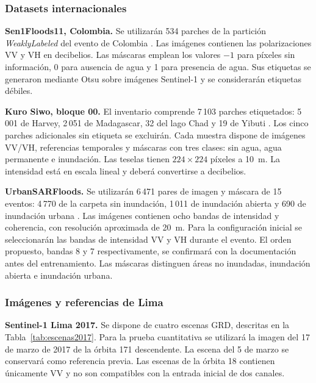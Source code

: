 \documentclass[conference]{IEEEtran}
\begin{document}
\subsubsection{Datasets internacionales}

\textbf{Sen1Floods11, Colombia.}
Se utilizarán 534 parches de la partición
\textit{WeaklyLabeled} del evento de Colombia
\cite{bonafilia2020sen1floods11}.
Las imágenes contienen las polarizaciones VV y VH
en decibelios. Las máscaras emplean los valores
$-1$ para píxeles sin información, 0 para ausencia
de agua y 1 para presencia de agua. Sus etiquetas
se generaron mediante Otsu sobre imágenes
Sentinel-1 y se considerarán etiquetas débiles.

\textbf{Kuro Siwo, bloque 00.}
El inventario comprende 7\,103 parches etiquetados:
5\,001 de Harvey, 2\,051 de Madagascar,
32 del lago Chad y 19 de Yibuti
\cite{bountos2024kurosiwo}.
Los cinco parches adicionales sin etiqueta
se excluirán. Cada muestra dispone de imágenes
VV/VH, referencias temporales y máscaras con
tres clases: sin agua, agua permanente e inundación.
Las teselas tienen $224\times224$ píxeles a 10~m.
La intensidad está en escala lineal y deberá
convertirse a decibelios.

\textbf{UrbanSARFloods.}
Se utilizarán 6\,471 pares de imagen y máscara
de 15 eventos: 4\,770 de la carpeta sin inundación,
1\,011 de inundación abierta y 690 de inundación
urbana \cite{zhao2024urbansarfloods}.
Las imágenes contienen ocho bandas de intensidad
y coherencia, con resolución aproximada de 20~m.
Para la configuración inicial se seleccionarán
las bandas de intensidad VV y VH durante el evento.
El orden propuesto, bandas 8 y 7 respectivamente,
se confirmará con la documentación antes del
entrenamiento. Las máscaras distinguen áreas
no inundadas, inundación abierta e inundación urbana.

\subsubsection{Imágenes y referencias de Lima}

\textbf{Sentinel-1 Lima 2017.}
Se dispone de cuatro escenas GRD, descritas en
la Tabla~\ref{tab:escenas2017}. Para la prueba
cuantitativa se utilizará la imagen del
17 de marzo de 2017 de la órbita 171 descendente.
La escena del 5 de marzo se conservará como
referencia previa. Las escenas de la órbita 18
contienen únicamente VV y no son compatibles
con la entrada inicial de dos canales.
\end{document}
